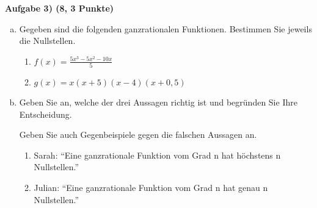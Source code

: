 \documentclass[a4paper,11pt, headsepline,headinclude]{scrreprt}
\newcommand{\Aufg}[3]{%
            \vspace{5mm} \textbf{Aufgabe #1  \hfill (#2 Punkte)} }
\begin{document}
\Aufg{3)}{8, 3}\\
\begin{enumerate}[a)]
 \item Gegeben sind die folgenden ganzrationalen Funktionen. Bestimmen Sie jeweils die Nullstellen.
  \begin{enumerate}[1.]
   \item $f(x)= \frac{5x^3-5x^2-10x}{5}$
   \item $g(x)= x(x+5)(x-4)(x+0,5)$
  \end{enumerate}
 \item Geben Sie an, welche der drei Aussagen richtig ist und begründen Sie Ihre Entscheidung.

Geben Sie auch Gegenbeispiele gegen die falschen Aussagen an.
 \begin{enumerate}[1.]
  \item Sarah:  \enquote{Eine ganzrationale Funktion vom Grad n hat höchstens n Nullstellen.}
  \item Julian: \enquote{Eine ganzrationale Funktion vom Grad n hat genau n Nullstellen.}
 \end{enumerate}

\end{enumerate}



{}
\end{document}
